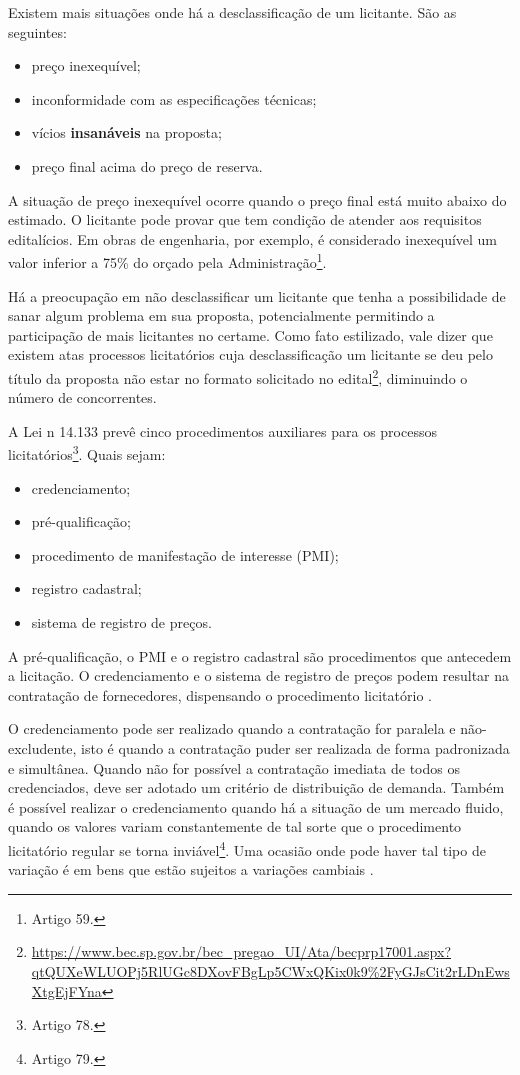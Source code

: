 Existem mais situações onde há a desclassificação de um licitante. São as seguintes:
\begin{itemize}
    \item {preço inexequível;}
    \item {inconformidade com as especificações técnicas;}
    \item {vícios \textbf{insanáveis} na proposta;}
    \item {preço final acima do preço de reserva.}
\end{itemize}

A situação de preço inexequível ocorre quando o preço final está muito abaixo do estimado. O licitante pode provar que tem condição de atender aos requisitos editalícios. Em obras de engenharia, por exemplo, é considerado inexequível um valor inferior a 75\% do orçado pela Administração\footnote{Artigo 59.}.

Há a preocupação em não desclassificar um licitante que tenha a possibilidade de sanar algum problema em sua proposta, potencialmente permitindo a participação de mais licitantes no certame. Como fato estilizado, vale dizer que existem atas processos licitatórios cuja desclassificação um licitante se deu pelo título da proposta não estar no formato solicitado no edital\footnote{\url{https://www.bec.sp.gov.br/bec_pregao_UI/Ata/becprp17001.aspx?qtQUXeWLUOPj5RlUGc8DXovFBgLp5CWxQKix0k9\%2FyGJsCit2rLDnEwsXtgEjFYna}}, diminuindo o número de concorrentes.

A Lei n{\textordmasculine} 14.133 prevê cinco procedimentos auxiliares para os processos licitatórios\footnote{Artigo 78.}. Quais sejam:
\begin{itemize}
    \item {credenciamento;}
    \item {pré-qualificação;}
    \item {procedimento de manifestação de interesse (PMI);}
    \item {registro cadastral;}
    \item {sistema de registro de preços.}
\end{itemize}

A pré-qualificação, o PMI e o registro cadastral são procedimentos que antecedem a licitação. O credenciamento e o sistema de registro de preços podem resultar na contratação de fornecedores, dispensando o procedimento licitatório \citet{TCE2022}.

O credenciamento pode ser realizado quando a contratação for paralela e não-excludente, isto é quando a contratação puder ser realizada de forma padronizada e simultânea. Quando não for possível a contratação imediata de todos os credenciados, deve ser adotado um critério de distribuição de demanda. Também é possível realizar o credenciamento quando há a situação de um mercado fluido, quando os valores variam constantemente de tal sorte que o procedimento licitatório regular se torna inviável\footnote{Artigo 79.}. Uma ocasião onde pode haver tal tipo de variação é em bens que estão sujeitos a variações cambiais \citet{TCE2022}.

